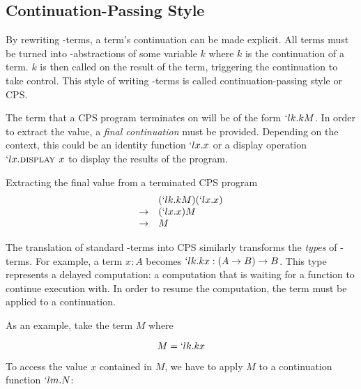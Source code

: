   \subsection{Continuation-Passing Style}
 
  By rewriting \lam-terms, a term's continuation can be made explicit. All
  terms must be turned into \lam-abstractions of some variable $k$
  where $k$ is the continuation of a term. $k$ is then called on the
  result of the term, triggering the continuation to take control.
  This style of writing \lam-terms is called continuation-passing
  style or CPS.
  
  
  The term that a CPS program terminates on will be of the form
  $`lk.kM$. In order to extract the value, a \emph{final continuation}
  must be provided. Depending on the context, this could be an identity 
  function $`lx.x$ or a display operation $`lx.\textsc{display }x$ to
  display the results of the program.

  \begin{example}{Extracting the final value from a terminated CPS program}
  \[
  \begin{array}{ll}
                & (`lk.kM)(`lx.x) \\
    \rightarrow & (`lx.x)M \\
    \rightarrow & M
  \end{array}
  \]
  \end{example}
 
  The translation of standard \lam-terms into CPS similarly transforms the 
  \emph{types} of \lam-terms. For example, a term $x : A$ becomes 
  $`lk.kx : (A \to B) \to B$. This type represents a delayed computation:
  a computation that is waiting for a function to continue execution with. 
  In order to resume the computation, the term must be applied to a 
  continuation.
  
  As an example, take the term $M$ where
  
  \[
    M = `lk.kx
  \]

  To access the value $x$ contained in $M$, we have to apply $M$ to a
  continuation function $`lm.N$:
  
